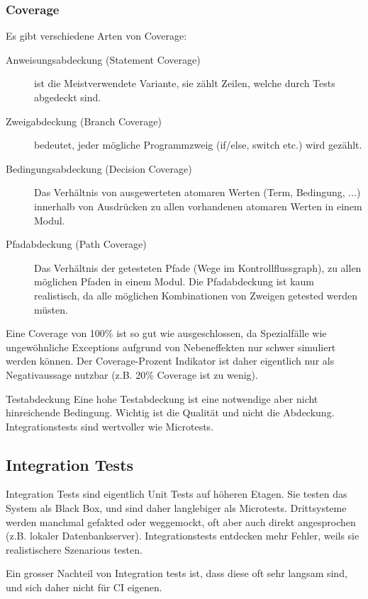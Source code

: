 \subsubsection{Coverage}
Es gibt verschiedene Arten von Coverage:

\begin{description}
	\item[Anweisungsabdeckung (Statement Coverage)] ist die Meistverwendete Variante, sie zählt Zeilen, welche durch Tests abgedeckt sind.
	\item[Zweigabdeckung (Branch Coverage)]  bedeutet,  jeder mögliche Programmzweig (if/else, switch etc.) wird gezählt.
	\item[Bedingungsabdeckung (Decision Coverage)]  Das Verhältnis von ausgewerteten atomaren Werten (Term, Bedingung, ...) innerhalb von Ausdrücken zu allen vorhandenen atomaren Werten in einem Modul.
	\item[Pfadabdeckung (Path Coverage)]  Das Verhältnis der getesteten Pfade (Wege im Kontrollflussgraph), zu allen möglichen Pfaden in einem Modul. Die Pfadabdeckung ist kaum realistisch, da alle möglichen Kombinationen von Zweigen getested werden müsten.
\end{description}

Eine Coverage von 100\% ist so gut wie ausgeschlossen, da Spezialfälle wie ungewöhnliche Exceptions aufgrund von Nebeneffekten nur schwer simuliert werden können. Der Coverage-Prozent Indikator ist daher eigentlich nur als Negativaussage nutzbar (z.B. 20\% Coverage ist zu wenig).

\begin{remember}{Testabdeckung}{}
Eine hohe Testabdeckung ist eine notwendige aber nicht hinreichende Bedingung. Wichtig ist die Qualität und nicht die Abdeckung. Integrationstests sind wertvoller wie Microtests.
\end{remember}

\subsection{Integration Tests}

Integration Tests sind eigentlich Unit Tests auf höheren Etagen. Sie testen das System als Black Box, und sind daher langlebiger als Microtests. Drittsysteme werden manchmal gefakted oder weggemockt, oft aber auch direkt angesprochen (z.B. lokaler Datenbankserver). Integrationstests entdecken mehr Fehler, weils sie realistischere Szenarious testen. 

Ein grosser Nachteil von Integration tests ist, dass diese oft sehr langsam sind, und sich daher nicht für CI eigenen.


